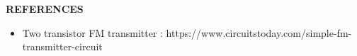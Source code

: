 \thispagestyle{plain}

\begin{center}
	\Large {\bf \uppercase{References}}
\end{center}

\vspace{3\baselineskip}
  

	\begin{itemize}
	\item Two transistor FM transmitter : https://www.circuitstoday.com/simple-fm-transmitter-circuit
\end{itemize}